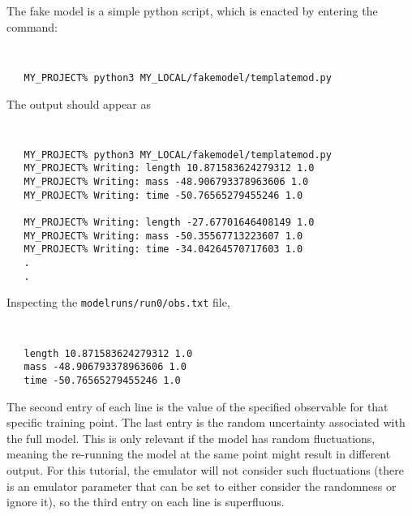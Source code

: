 \documentclass[UserManual.tex]{subfiles}
\begin{document}
The fake model is a simple python script, which is enacted by entering the command:
\vspace{-20pt}
{\tt
\begin{verbatim}
   MY_PROJECT% python3 MY_LOCAL/fakemodel/templatemod.py
\end{verbatim}
}
The output should appear as
\vspace{-20pt}
{\tt
\begin{verbatim}
   MY_PROJECT% python3 MY_LOCAL/fakemodel/templatemod.py
   MY_PROJECT% Writing: length 10.871583624279312 1.0
   MY_PROJECT% Writing: mass -48.906793378963606 1.0
   MY_PROJECT% Writing: time -50.76565279455246 1.0

   MY_PROJECT% Writing: length -27.67701646408149 1.0
   MY_PROJECT% Writing: mass -50.35567713223607 1.0
   MY_PROJECT% Writing: time -34.04264570717603 1.0
   .
   .
\end{verbatim}
}
Inspecting the {\tt modelruns/run0/obs.txt} file,
\vspace{-20pt}
{\tt
\begin{verbatim}
   length 10.871583624279312 1.0
   mass -48.906793378963606 1.0
   time -50.76565279455246 1.0
\end{verbatim}
}
The second entry of each line is the value of the specified observable for that specific training point. The last entry is the random uncertainty associated with the full model. This is only relevant if the model has random fluctuations, meaning the re-running the model at the same point might result in different output. For this tutorial, the emulator will not consider such fluctuations (there is an emulator parameter that can be set to either consider the randomness or ignore it), so the third entry on each line is superfluous.
\end{document}
